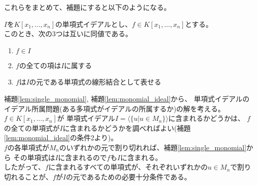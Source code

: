 \begin{frame}
	これらをまとめて、補題にすると以下のようになる。
	\begin{lemma}
		\label{lem:monomial_ideal}
		$I$を$K[x_1, \ldots, x_n]$の単項式イデアルとし、$f \in K[x_1, \ldots, x_n]$とする。\\
		このとき、次の3つは互いに同値である。\\
		\begin{enumerate}
			\item $f \in I$
			\item $f$の全ての項は$I$に属する
			\item $f$は$I$の元である単項式の線形結合として表せる
		\end{enumerate}
	\end{lemma}
\end{frame}

\begin{frame}
	補題\ref{lem:single_monomial}, 補題\ref{lem:monomial_ideal}から、
	単項式イデアルのイデアル所属問題(ある多項式がイデアルの所属するか)の解を考える。\\
	$f \in K[x_1, \ldots, x_n]$が
	単項式イデアル$I = \langle \{ u |u \in M_n \} \rangle$に含まれるかどうかは、
	$f$の全ての単項式が$I$に含まれるかどうかを調べればよい(補題\ref{lem:monomial_ideal}の条件2より)。\\
	$f$の各単項式が$M_n$のいずれかの元で割り切れれば、補題\ref{lem:single_monomial}から
	その単項式は$I$に含まれるので$f$も$I$に含まれる。\\
	したがって、$f$に含まれるすべての単項式が、それぞれいずれかの$u \in M_n$で割り切れることが、$f$が$I$の元であるための必要十分条件である。
\end{frame}
